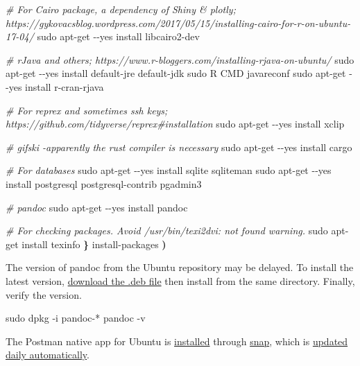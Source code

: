 \documentclass[
]{book}
\newenvironment{Shaded}{\begin{snugshade}}{\end{snugshade}}
\newcommand{\CommentTok}[1]{\textcolor[rgb]{0.56,0.35,0.01}{\textit{#1}}}
\newcommand{\ExtensionTok}[1]{#1}
\newcommand{\FunctionTok}[1]{\textcolor[rgb]{0.00,0.00,0.00}{#1}}
\newcommand{\KeywordTok}[1]{\textcolor[rgb]{0.13,0.29,0.53}{\textbf{#1}}}
\newcommand{\NormalTok}[1]{#1}
\begin{document}
\begin{Shaded}
\begin{Highlighting}[]
  \CommentTok{\# For Cairo package, a dependency of Shiny \& plotly; https://gykovacsblog.wordpress.com/2017/05/15/installing{-}cairo{-}for{-}r{-}on{-}ubuntu{-}17{-}04/}
  \FunctionTok{sudo}\NormalTok{ apt{-}get {-}{-}yes install libcairo2{-}dev}

  \CommentTok{\# \textquotesingle{}rJava\textquotesingle{} and others; https://www.r{-}bloggers.com/installing{-}rjava{-}on{-}ubuntu/}
  \FunctionTok{sudo}\NormalTok{ apt{-}get {-}{-}yes install default{-}jre default{-}jdk}
  \FunctionTok{sudo}\NormalTok{ R CMD javareconf}
  \FunctionTok{sudo}\NormalTok{ apt{-}get {-}{-}yes install r{-}cran{-}rjava}

  \CommentTok{\# For reprex and sometimes ssh keys; https://github.com/tidyverse/reprex\#installation}
  \FunctionTok{sudo}\NormalTok{ apt{-}get {-}{-}yes install xclip}

  \CommentTok{\# gifski {-}apparently the rust compiler is necessary}
  \FunctionTok{sudo}\NormalTok{ apt{-}get {-}{-}yes install cargo}

  \CommentTok{\# For databases}
  \FunctionTok{sudo}\NormalTok{ apt{-}get {-}{-}yes install sqlite sqliteman}
  \FunctionTok{sudo}\NormalTok{ apt{-}get {-}{-}yes install postgresql postgresql{-}contrib pgadmin3}

  \CommentTok{\# pandoc}
  \FunctionTok{sudo}\NormalTok{ apt{-}get {-}{-}yes install pandoc}

  \CommentTok{\# For checking packages. Avoid \textasciigrave{}/usr/bin/texi2dvi: not found\textasciigrave{} warning.}
  \FunctionTok{sudo}\NormalTok{ apt{-}get install texinfo}
\KeywordTok{\}}
\ExtensionTok{install{-}packages}
\KeywordTok{)}
\end{Highlighting}
\end{Shaded}

The version of pandoc from the Ubuntu repository may be delayed. To install the latest version, \href{https://github.com/jgm/pandoc/releases}{download the .deb file} then install from the same directory. Finally, verify the version.

\begin{Shaded}
\begin{Highlighting}[]
\FunctionTok{sudo}\NormalTok{ dpkg {-}i pandoc{-}*}
\ExtensionTok{pandoc}\NormalTok{ {-}v}
\end{Highlighting}
\end{Shaded}

The Postman native app for Ubuntu is \href{https://learning.getpostman.com/docs/postman/launching-postman/installation-and-updates/\#installing-postman-on-linux}{installed} through \href{https://tutorials.ubuntu.com/tutorial/basic-snap-usage}{snap}, which is \href{https://tutorials.ubuntu.com/tutorial/basic-snap-usage\#2}{updated daily automatically}.
\end{document}
